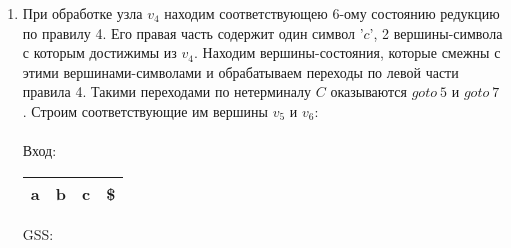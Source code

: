 \begin{example}
\begin{enumerate}
		\\
		
		\item При обработке узла $v_4$ находим соответствующею 6-ому состоянию редукцию по правилу 4. Его правая часть содержит один символ '$c$', 2 вершины-символа с которым достижимы из $v_4$. Находим вершины-состояния, которые смежны с этими вершинами-символами и обрабатываем переходы по левой части правила 4. Такими переходами по нетерминалу $C$ оказываются $goto\ 5$ и $goto\ 7$. Строим соответствующие им вершины $v_5$ и $v_6$:\\ \\
		Вход: \,
		\begin{tabular}[c]{ |c|c|c|c| } 
			\hline a & b & c & \$ \\ \hline
		\end{tabular}
		\qquad GSS: \,
		\begin{tikzpicture}[x=0.5pt,y=0.5pt,yscale=-1,xscale=1]
		

\end{tikzpicture}
\end{enumerate}
\end{example}
